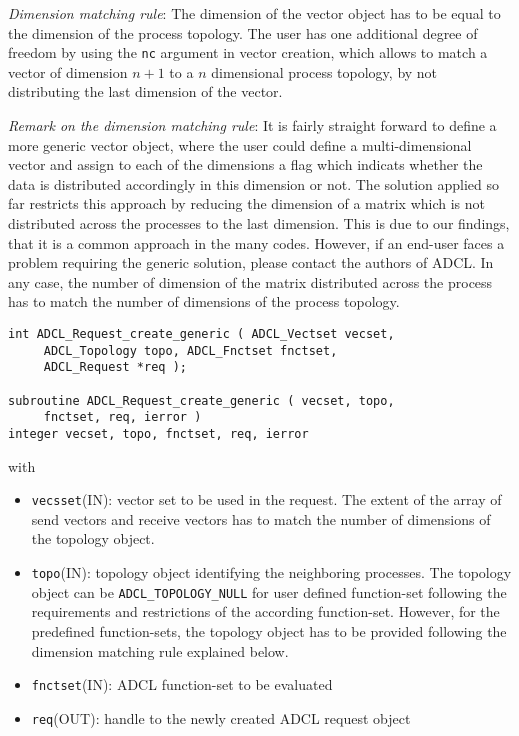 {\it Dimension matching rule}: The dimension of the vector object has to be
equal to the dimension of the process topology. The user has one additional
degree of freedom by using the {\tt nc} argument in vector creation, which
allows to match a vector of dimension $n+1$ to a $n$ dimensional process
topology, by not distributing the last dimension of the vector.

{\it Remark on the dimension matching rule}: It is fairly straight forward to
define a more generic vector object, where the user could define a
multi-dimensional vector and assign to each of the dimensions a flag which
indicats whether the data is distributed accordingly in this dimension or not.
The solution applied so far restricts this approach by reducing the dimension
of a matrix which is not distributed across the processes to the last
dimension. This is due to our findings, that it is a common approach in the
many codes. However, if an end-user faces a problem requiring the generic
solution, please contact the authors of ADCL. In any case, the number of
dimension of the matrix distributed across the process has to match the number
of dimensions of the process topology.


\begin{verbatim}
int ADCL_Request_create_generic ( ADCL_Vectset vecset, 
     ADCL_Topology topo, ADCL_Fnctset fnctset, 
     ADCL_Request *req );
      
subroutine ADCL_Request_create_generic ( vecset, topo, 
     fnctset, req, ierror )
integer vecset, topo, fnctset, req, ierror
\end{verbatim}
with
\begin{itemize}
\item {\tt vecsset}(IN): vector set to be used in the request. The extent of
  the array of send vectors and receive vectors has to match the number of
  dimensions of the topology object.
\item {\tt topo}(IN): topology object identifying the neighboring processes.
  The topology object can be {\tt ADCL\_TOPOLOGY\_NULL} for user defined
  function-set following the requirements and restrictions of the according
  function-set. However, for the predefined function-sets, the topology object
  has to be provided following the dimension matching rule explained below.
\item {\tt fnctset}(IN): ADCL function-set to be evaluated
\item {\tt req}(OUT): handle to the newly created ADCL request object
\end{itemize}
\hspace{1cm}


